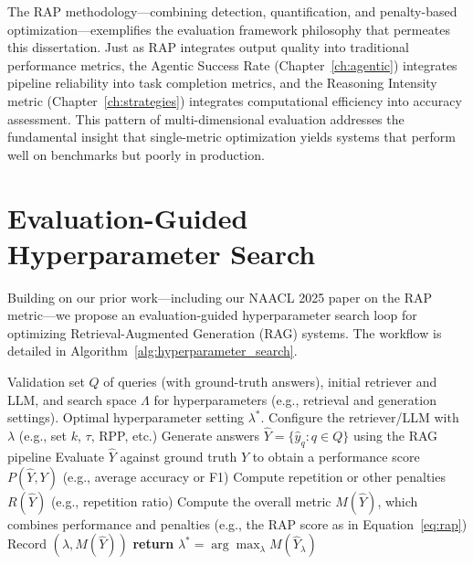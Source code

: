 The RAP methodology---combining detection, quantification, and penalty-based optimization---exemplifies the evaluation framework philosophy that permeates this dissertation. Just as RAP integrates output quality into traditional performance metrics, the Agentic Success Rate (Chapter~\ref{ch:agentic}) integrates pipeline reliability into task completion metrics, and the Reasoning Intensity metric (Chapter~\ref{ch:strategies}) integrates computational efficiency into accuracy assessment. This pattern of multi-dimensional evaluation addresses the fundamental insight that single-metric optimization yields systems that perform well on benchmarks but poorly in production.

\section{Evaluation-Guided Hyperparameter Search}
\label{sec:rag_opt}

Building on our prior work---including our NAACL 2025 paper on the RAP metric---we propose an evaluation-guided hyperparameter search loop for optimizing Retrieval-Augmented Generation (RAG) systems. The workflow is detailed in Algorithm~\ref{alg:hyperparameter_search}.

\begin{algorithm}[htbp]
\caption{Hyperparameter Search for RAG Optimization}
\label{alg:hyperparameter_search}
\begin{algorithmic}[1]
\Require Validation set $Q$ of queries (with ground-truth answers), initial retriever and LLM, and search space $\Lambda$ for hyperparameters (e.g., retrieval and generation settings).
\Ensure Optimal hyperparameter setting $\lambda^*$.
    \State Configure the retriever/LLM with $\lambda$ (e.g., set $k$, $\tau$, RPP, etc.)
    \State Generate answers $\hat{Y} = \{\hat{y}_q : q \in Q\}$ using the RAG pipeline
    \State Evaluate $\hat{Y}$ against ground truth $Y$ to obtain a performance score $P(\hat{Y}, Y)$ (e.g., average accuracy or F1)
    \State Compute repetition or other penalties $R(\hat{Y})$ (e.g., repetition ratio)
    \State Compute the overall metric $M(\hat{Y})$, which combines performance and penalties (e.g., the RAP score as in Equation~\ref{eq:rap})
    \State Record $(\lambda, M(\hat{Y}))$
\EndFor
\State \textbf{return} $\lambda^* = \arg\max_{\lambda} M(\hat{Y}_\lambda)$
\end{algorithmic}
\end{algorithm}

